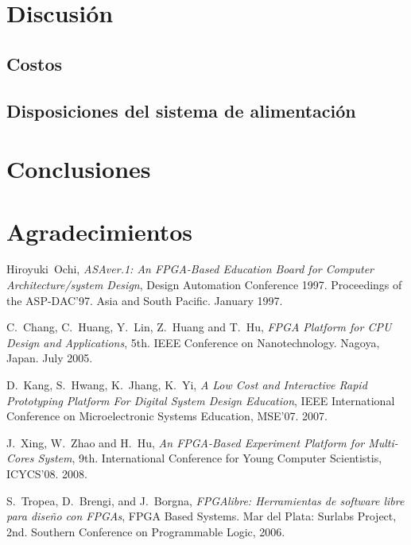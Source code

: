 \documentclass[conference]{IEEEtran}
\begin{document}
\section{Discusión}

\subsection{Costos}
\label{sec:costos}

\lipsum[60-64]

\subsection{Disposiciones del sistema de alimentación}
\label{sec:disp-sistem-alim}

\lipsum[66-69]

\section{Conclusiones}

\lipsum[70-73]

\section*{Agradecimientos}

\lipsum[75-80]

\begin{thebibliography}{1}


Hiroyuki~Ochi, \emph{ASAver.1: An FPGA-Based Education Board for
  Computer Architecture/system Design}, Design Automation Conference
1997. Proceedings of the ASP-DAC'97. Asia and South Pacific. January
1997.

C.~Chang, C.~Huang, Y.~Lin, Z.~Huang and T.~Hu, \emph{FPGA Platform
  for CPU Design and Applications},  5th. IEEE Conference on
Nanotechnology. Nagoya, Japan. July 2005.

D.~Kang, S.~Hwang, K.~Jhang, K.~Yi, \emph{A Low Cost and Interactive
  Rapid Prototyping Platform For Digital System Design Education},
IEEE International Conference on Microelectronic Systems Education,
MSE'07. 2007. 

J.~Xing, W.~Zhao and H.~Hu, \emph{An FPGA-Based Experiment Platform
  for Multi-Cores System}, 9th. International Conference for Young
Computer Scientistis, ICYCS'08. 2008. 

S.~Tropea, D.~Brengi, and J.~Borgna, \emph{FPGAlibre: Herramientas de
  software libre para diseño con FPGAs}, FPGA Based Systems. Mar del
Plata: Surlabs Project, 2nd. Southern Conference on Programmable
Logic, 2006.

\end{thebibliography}

\end{document}
